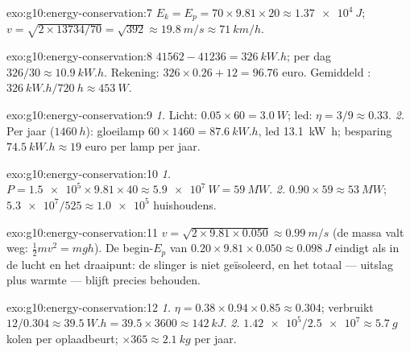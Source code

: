\begin{solution}{exo:g10:energy-conservation:7}
$E_k = E_p = 70 \times 9.81 \times 20 \approx \qty{1.37e4}{J}$;
$v = \sqrt{2 \times 13734/70} = \sqrt{392} \approx \qty{19.8}{m/s}
\approx \qty{71}{km/h}$.
\end{solution}

\begin{solution}{exo:g10:energy-conservation:8}
$41562 - 41236 = \qty{326}{kW.h}$; per dag $326/30 \approx
\qty{10.9}{kW.h}$. Rekening: $326 \times 0.26 + 12 = 96.76$ euro.
Gemiddeld : $\qty{326}{kW.h}/\qty{720}{h} \approx \qty{453}{W}$.
\end{solution}

\begin{solution}{exo:g10:energy-conservation:9}
\emph{1.} Licht: $0.05 \times 60 = \qty{3.0}{W}$; led:
$\eta = 3/9 \approx 0.33$.
\emph{2.} Per jaar ($\qty{1460}{h}$): gloeilamp
$60 \times 1460 = \qty{87.6}{kW.h}$, led \qty{13.1}{kW.h}; besparing
$\qty{74.5}{kW.h} \approx 19$ euro per lamp per jaar.
\end{solution}

\begin{solution}{exo:g10:energy-conservation:10}
\emph{1.} $P = \num{1.5e5} \times 9.81 \times 40 \approx
\qty{5.9e7}{W} = \qty{59}{MW}$.
\emph{2.} $0.90 \times 59 \approx \qty{53}{MW}$;
$\num{5.3e7}/525 \approx \num{1.0e5}$ huishoudens.
\end{solution}

\begin{solution}{exo:g10:energy-conservation:11}
$v = \sqrt{2 \times 9.81 \times 0.050} \approx \qty{0.99}{m/s}$ (de
massa valt weg: $\tfrac12 m v^2 = mgh$). De begin-$E_p$ van
$0.20 \times 9.81 \times 0.050 \approx \qty{0.098}{J}$ eindigt als
 in de lucht en het draaipunt: de slinger is niet
geïsoleerd, en het totaal --- uitslag plus warmte --- blijft precies
behouden.
\end{solution}

\begin{solution}{exo:g10:energy-conservation:12}
\emph{1.} $\eta = 0.38 \times 0.94 \times 0.85 \approx 0.304$;
verbruikt $12/0.304 \approx \qty{39.5}{W.h}
= 39.5 \times 3600 \approx \qty{142}{kJ}$.
\emph{2.} $\num{1.42e5}/\num{2.5e7} \approx \qty{5.7}{g}$ kolen per
oplaadbeurt; $\times 365 \approx \qty{2.1}{kg}$ per jaar.
\end{solution}

